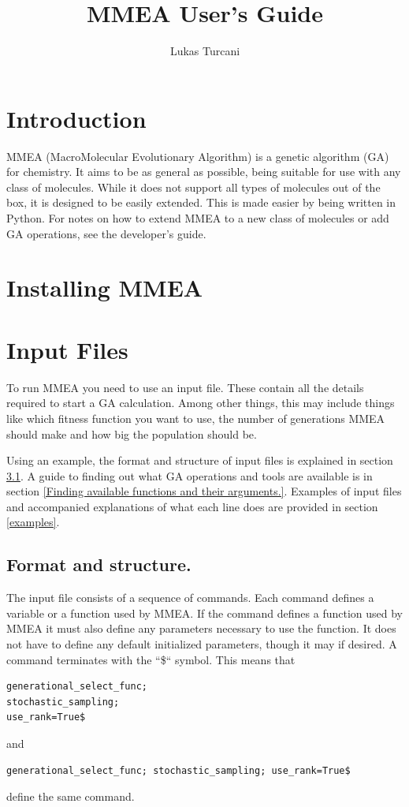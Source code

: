 \documentclass[12pt]{article}
\title{MMEA User's Guide}
\author{Lukas Turcani}
\begin{document}
\begin{titlepage}
	\maketitle
\end{titlepage}

\tableofcontents
\newpage
\section{Introduction}
MMEA (MacroMolecular Evolutionary Algorithm) is a genetic algorithm (GA) for chemistry. It aims to be as general as possible, being suitable for use with any class of molecules. While it does not support all types of molecules out of the box, it is designed to be easily extended. This is made easier by being written in Python. For notes on how to extend MMEA to a new class of molecules or add GA operations, see the developer's guide.

\section{Installing MMEA}

\section{Input Files}
To run MMEA you need to use an input file. These contain all the details required to start a GA calculation. Among other things, this may include things like which fitness function you want to use, the number of generations MMEA should make and how big the population should be.

Using an example, the format and structure of input files is explained in section \ref{input_files_format_and_structure}. A guide to finding out what GA operations and tools are available is in section \ref{Finding available functions and their arguments.}. Examples of input files and accompanied explanations of what each line does are provided in section \ref{examples}.

\subsection{Format and structure.}
\label{input_files_format_and_structure}

The input file consists of a sequence of commands. Each command defines a variable or a function used by MMEA. If the command defines a function used by MMEA it must also define any parameters necessary to use the function. It does not have to define any default initialized parameters, though it may if desired. A command terminates with the ``\$`` symbol. This means that 
\begin{Verbatim}
generational_select_func; 
stochastic_sampling; 
use_rank=True$
\end{Verbatim}
and
\begin{Verbatim}
generational_select_func; stochastic_sampling; use_rank=True$
\end{Verbatim}
define the same command.
\end{document}
